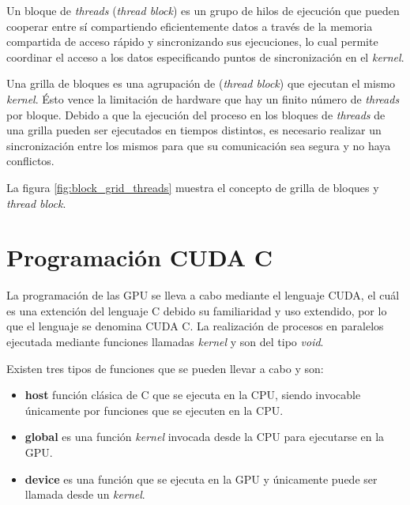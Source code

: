 Un bloque de \textit{threads} (\textit{thread block}) es un grupo de hilos de ejecución que pueden cooperar entre sí compartiendo eficientemente datos a través de la memoria compartida de acceso rápido y sincronizando sus ejecuciones, lo cual permite coordinar el acceso a los datos especificando puntos de sincronización en el \textit{kernel}. 

Una grilla de bloques es una agrupación de (\textit{thread block}) que ejecutan el mismo \textit{kernel}. Ésto vence la limitación de hardware que hay un finito número de \textit{threads} por bloque. Debido a que la ejecución del proceso en los bloques de \textit{threads} de una grilla pueden ser ejecutados en tiempos distintos, es necesario realizar un sincronización entre los mismos para que su comunicación sea segura y no haya conflictos.\cite{tolke2010implementation}

La figura \ref{fig:block_grid_threads} muestra el concepto de grilla de bloques y \textit{thread block}.

\section{Programación CUDA C}

La programación de las GPU se lleva a cabo mediante el lenguaje CUDA, el cuál es una extención del lenguaje C debido su familiaridad y uso extendido, por lo que el lenguaje se denomina CUDA C. La realización de procesos en paralelos ejecutada mediante funciones llamadas \textit{kernel} y son del tipo \textit{void}.

Existen tres tipos de funciones que se pueden llevar a cabo y son:

\begin{itemize}
	
	\item \textbf{host} función clásica de C que se ejecuta en la CPU, siendo invocable únicamente por funciones que se ejecuten en la CPU. 

	\item \textbf{global} es una función \textit{kernel} invocada desde la CPU para ejecutarse en la GPU. 
	
	\item \textbf{device} es una función que se ejecuta en la GPU y únicamente puede ser llamada desde un \textit{kernel}.
	
\end{itemize}

